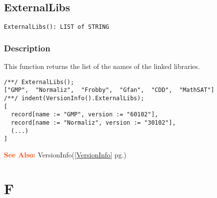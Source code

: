 \documentclass[a4paper]{mybook}
\newenvironment{command}{}{} %
\newcommand\SeeAlso{\par\textcolor{OrangeRed}{\textbf{\large See Also: }}}
\begin{document}
\section{ExternalLibs}
\label{ExternalLibs}
\begin{command} %


\begin{Verbatim}[label=syntax, rulecolor=\color{MidnightBlue},
frame=single]
ExternalLibs(): LIST of STRING
\end{Verbatim}


\subsection*{Description}

This function returns the list of the names of the linked libraries.
\begin{Verbatim}[label=example, rulecolor=\color{PineGreen}, frame=single]
/**/ ExternalLibs();
["GMP",  "Normaliz",  "Frobby",  "Gfan",  "CDD",  "MathSAT"]
/**/ indent(VersionInfo().ExternalLibs);
[
  record[name := "GMP", version := "60102"],
  record[name := "Normaliz", version := "30102"],
  (...)
]
\end{Verbatim}


\SeeAlso %
  VersionInfo(\ref{VersionInfo} pg.\pageref{VersionInfo})
\end{command} %

\chapter{F}  %
\label{F}
\end{document}

